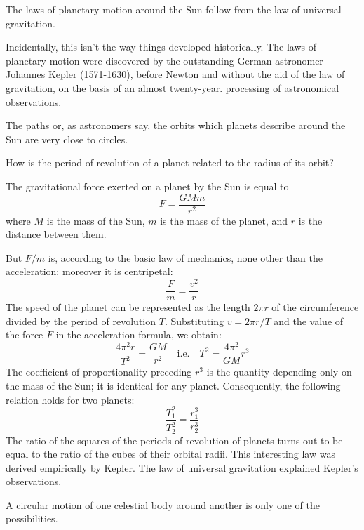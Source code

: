 The laws of planetary motion around the Sun follow
from the law of universal gravitation.

Incidentally, this isn't the way things developed
historically. The laws of planetary motion were discovered by the outstanding German astronomer Johannes
Kepler (1571-1630), before Newton and without the aid
of the law of gravitation, on the basis of an almost twenty-year. processing of astronomical observations.

The paths or, as astronomers say, the orbits which
planets describe around the Sun are very close to circles.

How is the period of revolution of a planet related
to the radius of its orbit?

The gravitational force exerted on a planet by the Sun
is equal to
 \begin{equation*}%
F = \dfrac{G M m}{r^{2}}
 \end{equation*}
where $M$ is the mass of the Sun, $m$ is the mass of the
planet, and $r$ is the distance between them.

But $F/m$ is, according to the basic law of mechanics,
none other than the acceleration; moreover it is centripetal:
 \begin{equation*}%
 \dfrac{F}{m} = \dfrac{v^{2}}{r}
 \end{equation*}
The speed of the planet can be represented as the
length $2 \pi r$ of the circumference divided by the period of revolution $T$. Substituting $v = 2 \pi r/T$ and the value
of the force $F$ in the acceleration formula, we obtain:
 \begin{equation*}%
 \dfrac{4 \pi^{2} r}{T^{2}} = \dfrac{GM}{r^{2}} \quad \textrm{i.e.} \quad T^{2}= \dfrac{4 \pi^{2}}{GM}  r^{3}
 \end{equation*}
The coefficient of proportionality preceding $r^{3}$ is the quantity depending only on the mass of the Sun; it is
identical for any planet. Consequently, the following relation holds for two planets:
 \begin{equation*}%
 \dfrac{T_{1}^{2} }{T_{2}^{2}} =  \dfrac{r_{1}^{3} }{r_{2}^{3}}
 \end{equation*}
 The ratio of the squares of the periods of revolution
of planets turns out to be equal to the ratio of the cubes
of their orbital radii. This interesting law was derived
empirically by Kepler. The law of universal gravitation
explained Kepler's observations.

A circular motion of one celestial body around another
is only one of the possibilities.

